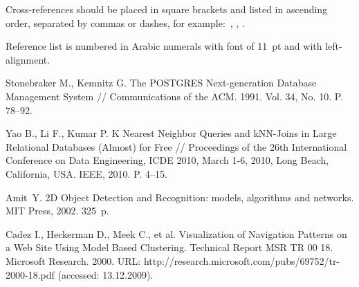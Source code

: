 \documentclass[11pt, oneside, a4paper]{article}
\begin{document}
Cross-references should be placed in square brackets and listed in ascending order, separated 
by commas or dashes, for example:~\cite{stonebraker},
\cite{stonebraker,  amit, cadez}, \cite{yao, amit,cadez}. 

Reference list is numbered in Arabic numerals with font of 11~pt and with left-alignment.

\begin{biblio}

Stonebraker M., Kemnitz G. The POSTGRES Next-generation Database Management System // Communications of the ACM. 1991. Vol. 34, No. 10. P. 78--92.

Yao B., Li F., Kumar P. K Nearest Neighbor Queries and kNN-Joins in Large Relational Databases (Almost) for Free // Proceedings of the 26th International Conference on Data Engineering, ICDE 2010, March 1-6, 2010, Long Beach, California, USA. IEEE, 2010. P. 4--15.

Amit~Y. 2D Object Detection and Recognition: models, algorithms and networks.
MIT Press, 2002. 325~p.

Cadez I., Heckerman D., Meek C., et al. Visualization of Navigation Patterns on a Web Site Using Model Based Clustering. Technical Report MSR TR 00 18. Microsoft Research. 2000. URL: http://research.microsoft.com/pubs/69752/tr-2000-18.pdf (accessed: 13.12.2009).

\end{biblio}
\end{document}
